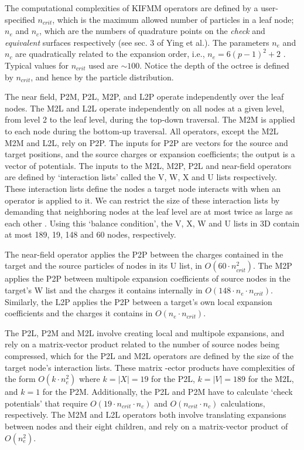 \documentclass{IEEEcsmag}
\begin{document}
The computational complexities of KIFMM operators are defined by a user-specified $n_{crit}$, which is the maximum allowed number of particles in a leaf node; $n_e$ and $n_c$, which are the numbers of quadrature points on the \textit{check} and \textit{equivalent} surfaces respectively (see sec. 3 of Ying et al.\cite{Ying2004}). The parameters $n_e$ and $n_c$ are quadratically related to the expansion order, i.e., $n_e = 6(p-1)^2 + 2$ \cite{Ying2004}. Typical values for $n_{crit}$ used are $\sim 100$. Notice the depth of the octree is defined by $n_{crit}$, and hence by the particle distribution.

The near field, P2M, P2L, M2P, and L2P operate independently over the leaf nodes. The M2L and L2L operate independently on all nodes at a given level, from level 2 to the leaf level, during the top-down traversal. The M2M is applied to each node during the bottom-up traversal.
All operators, except the M2L M2M and L2L, rely on P2P. The inputs for P2P are vectors for the source and target positions, and the source charges or expansion coefficients; the output is a vector of potentials.
The inputs to the M2L, M2P, P2L and near-field operators are defined by `interaction lists' called the V, W, X and U lists respectively. These interaction lists define the nodes a target node interacts with when an operator is applied to it. We can restrict the size of these interaction lists by demanding that neighboring nodes at the leaf level are at most twice as large as each other \cite{Sundar2007}. Using this `balance condition', the V, X, W and U lists in 3D contain at most 189, 19, 148 and 60 nodes, respectively.

The near-field operator applies the P2P between the charges contained in the target and the source particles of nodes in its U list, in $O(60 \cdot n_{crit}^2)$. The M2P applies the P2P between multipole expansion coefficients of source nodes in the target's W list and the charges it contains internally in $O(148 \cdot n_e \cdot n_{crit})$. Similarly, the L2P applies the P2P between a target's own local expansion coefficients and the charges it contains in $O(n_e \cdot n_{crit})$.

The P2L, P2M and M2L involve creating local and multipole expansions, and rely on a matrix-vector product related to the number of source nodes being compressed, which for the P2L and M2L operators are defined by the size of the target node's interaction lists. These matrix -ector products have complexities of the form $O(k \cdot n_e^2)$ where $k = |X| = 19$ for the P2L, $k = |V| = 189$ for the M2L, and $k = 1$ for the P2M. Additionally, the P2L and P2M have to calculate `check potentials' \cite{Ying2004} that require $O(19 \cdot n_{crit} \cdot n_c)$ and $O(n_{crit} \cdot n_c)$ calculations, respectively. The M2M and L2L operators both involve translating expansions between nodes and their eight children, and rely on a matrix-vector product of $O(n_e^2)$.
\end{document}
